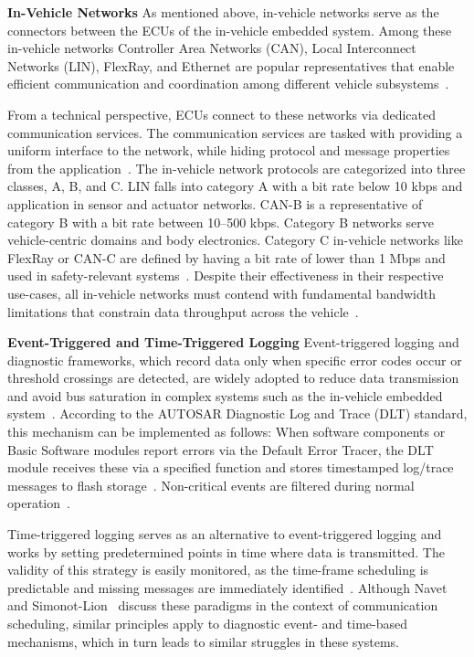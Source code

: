 \textbf{In-Vehicle Networks} As mentioned above, in-vehicle networks serve as the connectors between the ECUs of the in-vehicle embedded system. 
Among these in-vehicle networks Controller Area Networks (CAN), Local Interconnect Networks (LIN), FlexRay, and Ethernet are popular representatives that enable efficient communication and coordination among different vehicle subsystems~\cite[pp.~1-2--1-5]{Navet2009}. 

From a technical perspective, ECUs connect to these networks via dedicated communication services. The communication services are tasked with providing a uniform interface to the network, while hiding protocol and message properties from the application~\cite[p.~48]{AUTOSAR2022}. The in-vehicle network protocols are categorized into three classes, A, B, and C. LIN falls into category A with a bit rate below 10 kbps and application in sensor and actuator networks. CAN-B is a representative of category B with a bit rate between 10--500 kbps. Category B networks serve vehicle-centric domains and body electronics. Category C in-vehicle networks like FlexRay or CAN-C are defined by having a bit rate of lower than 1 Mbps and used in safety-relevant systems~\cite[pp.~1-12--1-13]{Navet2009}. Despite their effectiveness in their respective use-cases, all in-vehicle networks must contend with fundamental bandwidth limitations that constrain data throughput across the vehicle~\cite[pp.~1-18--1-19]{Navet2009}.

\textbf{Event-Triggered and Time-Triggered Logging} Event-triggered logging and diagnostic frameworks, which record data only when specific error codes occur or threshold crossings are detected, are widely adopted to reduce data transmission and avoid bus saturation in complex systems such as the in-vehicle embedded system~\cite[pp.~7--13]{AUTOSAR2022b}. According to the AUTOSAR Diagnostic Log and Trace (DLT) standard, this mechanism can be implemented as follows: When software components or Basic Software modules report errors via the Default Error Tracer, the DLT module receives these via a specified function and stores timestamped log/trace messages to flash storage~\cite[p.~25]{AUTOSAR2022b}. Non-critical events are filtered during normal operation~\cite[pp.~30--35]{AUTOSAR2022b}. 

Time-triggered logging serves as an alternative to event-triggered logging and works by setting predetermined points in time where data is transmitted. The validity of this strategy is easily monitored, as the time-frame scheduling is predictable and missing messages are immediately identified~\cite[pp.~4-5]{Navet2009}. Although Navet and Simonot-Lion~\cite{Navet2009} discuss these paradigms in the context of communication scheduling, similar principles apply to diagnostic event- and time-based mechanisms, which in turn leads to similar struggles in these systems.

